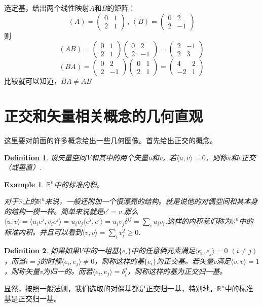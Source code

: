 \documentclass[11pt,a4paper,openany]{book}%
\theoremstyle{plain}%
\newtheorem{defi}{Definition}[chapter]%
\newtheorem{exa}{Example}[chapter]%
\begin{document}
选定基，给出两个线性映射$A$和$B$的矩阵：
\begin{equation}
(A)=\begin{pmatrix}
0&1\\
2&1
\end{pmatrix}
\,,\,
(B)=\begin{pmatrix}
0&2\\
2&-1
\end{pmatrix}
\end{equation}
则
\begin{equation}
(AB)=\begin{pmatrix}
0&1\\
2&1
\end{pmatrix}
\begin{pmatrix}
0&2\\
2&-1
\end{pmatrix}
=
\begin{pmatrix}
2&-1\\
2&3
\end{pmatrix}
\end{equation}
\begin{equation}
(BA)=\begin{pmatrix}
0&2\\
2&-1
\end{pmatrix}
\begin{pmatrix}
0&1\\
2&1
\end{pmatrix}
=
\begin{pmatrix}
4&2\\
-2&1
\end{pmatrix}
\end{equation}
比较就可以知道，$BA\neq AB$
\section{正交和矢量相关概念的几何直观}
这里要对前面的许多概念给出一些几何图像。首先给出正交的概念。
\begin{defi}
设矢量空间V和其中的两个矢量u和v，若$\langle u,v \rangle=0$，则称$u$和$v$正交（或垂直）.
\end{defi}
\begin{exa}
$\mathbb{R}^{n}$中的标准内积。

对于$\mathbb{R}$上的$\mathbb{R}^{n}$来说，一般还附加一个很漂亮的结构。就是说他的对偶空间和其本身的结构一模一样。简单来说就是$v'=v$.那么$\langle u,v \rangle=\langle u_ie^j,v_ie^j \rangle=u_iv_j\langle e^j,e^i \rangle=u_iv_j\delta^{ij}=\sum_i u_iv_i$.这样的内积我们称为$\mathbb{R}^{n}$中的标准内积。并且可以看到$\langle v,v \rangle=\sum_i v_i^2\geq 0$.
\end{exa}
\begin{defi}
如果如果$V$中的一组基$\{e_i\}$中的任意俩元素满足$\langle e_i,e_j \rangle=0$ $(i\neq j)$，而当$i=j$的时候$\langle e_i,e_j \rangle\neq 0$，则称这样的基$\{e_i\}$为正交基。若矢量v满足$\langle v,v\rangle=1$，则称矢量v为归一的。而若$\langle e_i,e_j \rangle=\delta_i^j$，则称这样的基为正交归一基。
\end{defi}
显然，按照一般法则，我们选取的对偶基都是正交归一基，特别地，$\mathbb{R}^{n}$中的标准基是正交归一基。
\end{document}
